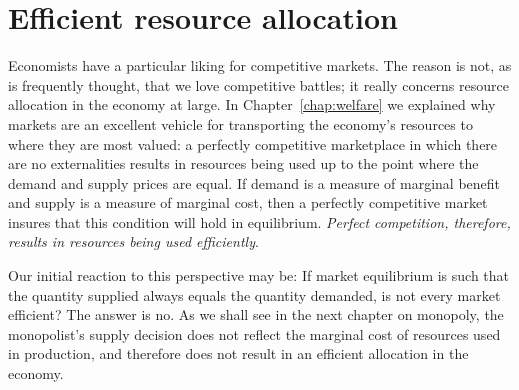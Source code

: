 \section{Efficient resource allocation}\label{sec:ch9sec7}

Economists have a particular liking for competitive markets. The reason is not, as is frequently thought, that we love competitive battles; it really concerns resource allocation in the economy at large. In Chapter~\ref{chap:welfare} we explained why markets are an excellent vehicle for transporting the economy's resources to where they are most valued: a perfectly competitive marketplace in which there are no externalities results in resources being used up to the point where the demand and supply prices are equal. If demand is a measure of marginal benefit and supply is a measure of marginal cost, then a perfectly competitive market insures that this condition will hold in equilibrium. \textit{Perfect competition, therefore, results in resources being used efficiently}.

Our initial reaction to this perspective may be: If market equilibrium is such that the quantity supplied always equals the quantity demanded, is not every market efficient? The answer is no. As we shall see in the next chapter on monopoly, the monopolist's supply decision does not reflect the marginal cost of resources used in production, and therefore does not result in an efficient allocation in the economy.